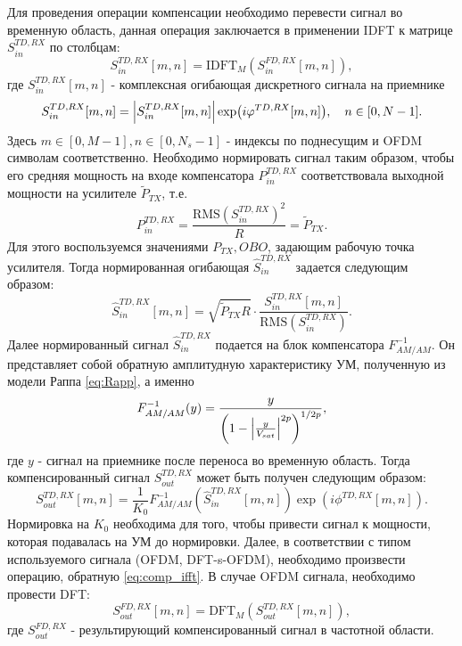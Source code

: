 Для проведения операции компенсации необходимо перевести сигнал во временную
область, данная операция заключается в применении IDFT к матрице $S^{TD,
RX}_{in}$ по столбцам:
\begin{equation}
    S^{TD, RX}_{in}[m, n] = \text{IDFT}_{M}\left(S^{FD, RX}_{in}[m, n]\right),
    \label{eq:comp_ifft}
\end{equation}
где $S^{TD, RX}_{in}[m, n]$ - комплексная огибающая дискретного сигнала на
приемнике
\begin{equation}
    S^{TD, RX}_{in}[m,n] = \abs{S^{TD,RX}_{in}[m,n]}\exp(i\varphi^{TD, RX}[m,n]),\quad n \in[0, N-1].
\end{equation}
Здесь $m \in [0, M-1],n \in [0, N_s-1]$ - индексы по поднесущим и OFDM
символам соответственно. Необходимо нормировать сигнал таким образом, чтобы
его средняя мощность на входе компенсатора $P^{TD, RX}_{in}$
соответствовала выходной мощности на усилителе $\tilde{P}_{TX}$, т.е.
\begin{equation}
    P^{TD, RX}_{in} = \frac{\text{RMS}\left(S^{TD, RX}_{in}\right)^2}{R} = \tilde{P}_{TX}.
\end{equation}
Для этого воспользуемся значениями $P_{TX}, OBO$, задающим рабочую точка
усилителя. Тогда нормированная огибающая $\hat{S}^{TD, RX}_{in}$ задается
следующим образом:
\begin{equation}
    \hat{S}^{TD, RX}_{in}[m, n] = \sqrt{\tilde{P}_{TX}R} \cdot
    \frac{S^{TD, RX}_{in}[m, n]}{\text{RMS}\left(S^{TD, RX}_{in}\right)}.
\end{equation}
Далее нормированный сигнал $\hat{S}^{TD, RX}_{in}$ подается на блок
компенсатора $F^{-1}_{AM/AM}$. Он представляет собой обратную амплитудную
характеристику УМ, полученную из модели Раппа \ref{eq:Rapp}, а именно
\begin{equation}
    \displaystyle
    F^{-1}_{AM/AM}(y) = 
       \frac{ y}{\left( 1 - \abs{\frac{y}{V_{sat}}}^{2p}\right)^{1/2p}},
    \label{eq:invRapp}
\end{equation}
где $y$ - сигнал на приемнике после переноса во временную область.
Тогда компенсированный сигнал $S^{TD, RX}_{out}$ может быть получен следующим образом:
\begin{equation}
    S^{TD, RX}_{out}[m, n] =
    \frac{1}{K_0}F^{-1}_{AM/AM}\left(\hat{S}^{TD, RX}_{in}[m, n]\right)
    \exp(i\phi^{TD, RX}[m, n]).
\end{equation}
Нормировка на $K_0$ необходима для того, чтобы привести сигнал к мощности,
которая подавалась на УМ до нормировки.
Далее, в соответствии с типом используемого сигнала (OFDM, DFT-s-OFDM),
необходимо произвести операцию, обратную \ref{eq:comp_ifft}. В случае OFDM
сигнала, необходимо провести DFT:
\begin{equation}
    S^{FD, RX}_{out}[m, n] = \text{DFT}_M\left(S^{TD, RX}_{out}[m, n]\right),
    \label{eq:ofdm_final_dft}
\end{equation}
где $S^{FD, RX}_{out}$ - результирующий компенсированный сигнал в частотной
области. 


